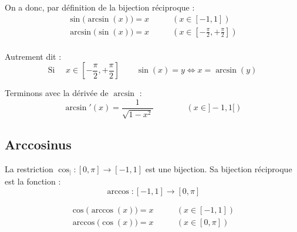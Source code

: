 \documentclass[11pt,class=report,crop=false]{standalone}
\begin{document}
\begin{center}
\begin{minipage}{0.55\textwidth}
\end{minipage}\qquad
\begin{minipage}{0.35\textwidth}
\end{minipage}
\end{center}
		

On a donc, par définition de la bijection réciproque :
$$
\begin{array}{cl}
	\displaystyle \sin\bigl(\arcsin(x)\bigr) = x &  \qquad (x \in [-1,1])\\
	\displaystyle \arcsin\bigl(\sin(x)\bigr) = x &  \qquad (x \in [-\frac\pi2,+\frac\pi2]) \\
\end{array}
$$
	
Autrement dit :
$$\text{Si } \quad  x\in \left[-\frac\pi2,+\frac\pi2\right] \qquad \sin(x)=y \iff x = \arcsin(y)$$

Terminons avec la dérivée de $\arcsin$ :
$$\arcsin'(x) = \frac{1}{\sqrt{1-x^2}} \qquad\qquad (x \in ]-1,1[)$$

\subsection{Arccosinus}


La restriction $\cos_| : [0,\pi] \to [-1,1]$
est une bijection. Sa bijection réciproque est la fonction  :
$$\arccos : [-1,1] \to [0,\pi]$$

\begin{center}
\begin{minipage}{0.55\textwidth}	
\end{minipage}\qquad
\begin{minipage}{0.35\textwidth}
\end{minipage}
\end{center}

$$
\begin{array}{cl}
	\displaystyle \cos\bigl(\arccos(x)\bigr) = x &  \qquad (x \in [-1,1])\\
	\displaystyle \arccos\bigl(\cos(x)\bigr) = x &  \qquad (x \in [0,\pi]) \\
\end{array}
$$
\end{document}
